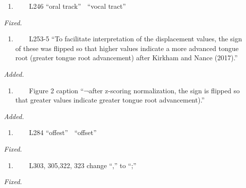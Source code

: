 \documentclass[]{article}
\providecommand{\tightlist}{%
  \setlength{\itemsep}{0pt}\setlength{\parskip}{0pt}}
\begin{document}
\begin{enumerate}
\def\labelenumi{\arabic{enumi}.}
\setcounter{enumi}{6}
\tightlist
\item
  ~~~~L246 ``oral track''  ``vocal tract''
\end{enumerate}

\begin{adjustwidth}{1cm}{} \textit{
Fixed.
} \end{adjustwidth}

\begin{enumerate}
\def\labelenumi{\arabic{enumi}.}
\setcounter{enumi}{7}
\tightlist
\item
  ~~~~L253-5 ``To facilitate interpretation of the displacement values,
  the sign of these was flipped so that higher values indicate a more
  advanced tongue root (greater tongue root advancement) after Kirkham
  and Nance (2017).''
\end{enumerate}

\begin{adjustwidth}{1cm}{} \textit{
Added.
} \end{adjustwidth}

\begin{enumerate}
\def\labelenumi{\arabic{enumi}.}
\setcounter{enumi}{8}
\tightlist
\item
  ~~~~Figure 2 caption ``¬after z-scoring normalization, the sign is
  flipped so that greater values indicate greater tongue root
  advancement).''
\end{enumerate}

\begin{adjustwidth}{1cm}{} \textit{
Added.
} \end{adjustwidth}

\begin{enumerate}
\def\labelenumi{\arabic{enumi}.}
\setcounter{enumi}{9}
\tightlist
\item
  ~~~~L284 ``offest''  ``offset''
\end{enumerate}

\begin{adjustwidth}{1cm}{} \textit{
Fixed.
} \end{adjustwidth}

\begin{enumerate}
\def\labelenumi{\arabic{enumi}.}
\setcounter{enumi}{10}
\tightlist
\item
  ~~~~L303, 305,322, 323 change ``,'' to ``;''
\end{enumerate}

\begin{adjustwidth}{1cm}{} \textit{
Fixed.
} \end{adjustwidth}
\end{document}

